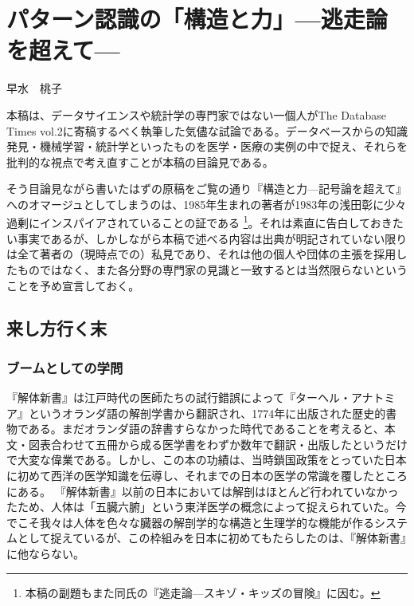 
\chapter{パターン認識の「構造と力」\Large{---逃走論を超えて---}}

\begin{flushright}
 早水　桃子 %
\end{flushright}

\begin{spacing}{0.6}
\noindent
{\footnotesize{本稿は、データサイエンスや統計学の専門家ではない一個人がThe Database Times vol.2に寄稿するべく執筆した気儘な試論である。データベースからの知識発見・機械学習・統計学といったものを医学・医療の実例の中で捉え、それらを批判的な視点で考え直すことが本稿の目論見である。

\noindent
そう目論見ながら書いたはずの原稿をご覧の通り『構造と力---記号論を超えて』へのオマージュとしてしまうのは、1985年生まれの著者が1983年の浅田彰に少々過剰にインスパイアされていることの証である
\footnote{本稿の副題もまた同氏の『逃走論---スキゾ・キッズの冒険』に因む。}。それは素直に告白しておきたい事実であるが、しかしながら本稿で述べる内容は出典が明記されていない限りは全て著者の（現時点での）私見であり、それは他の個人や団体の主張を採用したものではなく、また各分野の専門家の見識と一致するとは当然限らないということを予め宣言しておく。}}
\end{spacing}
 
\section{来し方行く末}
\subsection{ブームとしての学問}
『解体新書』は江戸時代の医師たちの試行錯誤によって『ターヘル・アナトミア』というオランダ語の解剖学書から翻訳され、1774年に出版された歴史的書物である。まだオランダ語の辞書すらなかった時代であることを考えると、本文・図表合わせて五冊から成る医学書をわずか数年で翻訳・出版したというだけで大変な偉業である。しかし、この本の功績は、当時鎖国政策をとっていた日本に初めて西洋の医学知識を伝導し、それまでの日本の医学の常識を覆したところにある。
『解体新書』以前の日本においては解剖はほとんど行われていなかったため、人体は「五臓六腑」という東洋医学の概念によって捉えられていた。今でこそ我々は人体を色々な臓器の解剖学的な構造と生理学的な機能が作るシステムとして捉えているが、この枠組みを日本に初めてもたらしたのは、『解体新書』に他ならない。

